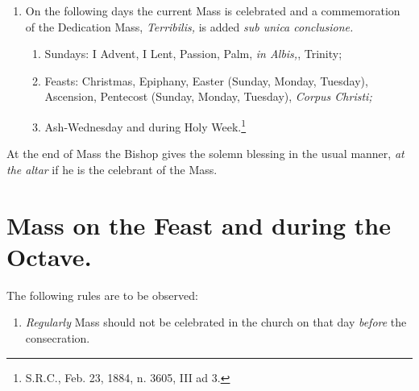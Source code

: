 \documentclass[letterpaper]{report}
\newcommand\src{\textsc{S.R.C.}}
\begin{document}
{\begin{enumerate}[label=(\Roman*)]
\begin{enumerate}[label=(\arabic*)]
                \item During the octaves of Epiphany, of Easter \textit{from
                    Wednesday to Saturday,} of Pentecost \textit{from Wednesday to
                    Saturday;}

                \item Vigils of Christmas and Pentecost.

            \end{enumerate}

        \item On the following days the current Mass is celebrated and a
            commemoration of the Dedication Mass, \textit{Terribilis,} is added
            \textit{sub unica conclusione.}

            \begin{enumerate}[label=(\arabic*)]

                \item Sundays: I Advent, I Lent, Passion, Palm, \textit{in Albis,},
                    Trinity;

                \item Feasts: Christmas, Epiphany, Easter (Sunday, Monday,
                    Tuesday), Ascension, Pentecost (Sunday, Monday, Tuesday),
                    \textit{Corpus Christi;}

                \item Ash-Wednesday and during Holy Week.\footnote{\src, Feb. 23,
                    1884, n. 3605, III ad 3.}

            \end{enumerate}

    \end{enumerate}

    \rubric At the end of Mass the Bishop gives the solemn blessing in the usual
    manner, \textit{at the altar} if he is the celebrant of the Mass.

    \section{Mass on the Feast and during the Octave.}

    \rubric The following rules are to be observed:

    \begin{enumerate}

        \item \textit{Regularly} Mass should not be celebrated in the church on
            that day \textit{before} the consecration.
        

\end{enumerate}}
\end{document}
